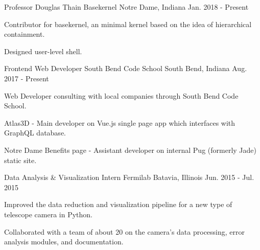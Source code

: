 \begin{cventries}
  \cventry
    {Professor Douglas Thain}
    {Basekernel}
    {Notre Dame, Indiana}
    {Jan. 2018 - Present}
    {
      \begin{cvitems}
        \item {Contributor for basekernel, an minimal kernel based on the idea of hierarchical containment.}
        \item {Designed user-level shell.}
      \end{cvitems}
    }
  \cventry
    {Frontend Web Developer}
    {South Bend Code School}
    {South Bend, Indiana}
    {Aug. 2017 - Present}
    {
      \begin{cvitems}
        \item {Web Developer consulting with local companies through South Bend Code School.}
        \item {Atlas3D - Main developer on Vue.js single page app which interfaces with GraphQL database.}
        \item {{Notre Dame Benefits page} - Assistant developer on internal Pug (formerly Jade) static site.\\}
      \end{cvitems}
    }
  \cventry
    {Data Analysis \& Visualization Intern}
    {Fermilab}
    {Batavia, Illinois}
    {Jun. 2015 - Jul. 2015}
    {
      \begin{cvitems}
        \item {Improved the data reduction and visualization pipeline for a new type
of telescope camera in Python.}
        \item {Collaborated with a team of about 20 on the camera’s data processing, error analysis modules, and documentation.}
      \end{cvitems}
    }
\end{cventries}
\iffalse
  \cventry
    {Donation Facilitator}
    {Notre Dame Alumni Center}
    {Notre Dame, Indiana}
    {Sep. 2016 - May. 2017}
    {
      \begin{cvitems}
        \item {Facilitated financial contributions to the University for various causes and campaigns.}
        \item {Exceeded the average amount of donations by more than 17\% in every report.}
      \end{cvitems}
    }
\fi
